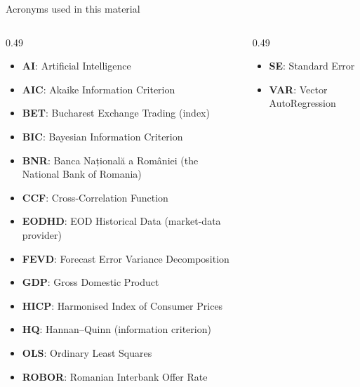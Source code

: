 {
\begin{frame}[noframenumbering]
    \titlepage
\end{frame}
}
\begin{frame}{Acronyms used in this material}
\begin{columns}[T]
\begin{column}{0.49\textwidth}
\begin{itemize}\setlength{\itemsep}{0pt}
    \item \textbf{AI}: Artificial Intelligence
    \item \textbf{AIC}: Akaike Information Criterion
    \item \textbf{BET}: Bucharest Exchange Trading (index)
    \item \textbf{BIC}: Bayesian Information Criterion
    \item \textbf{BNR}: Banca Națională a României (the National Bank of Romania)
    \item \textbf{CCF}: Cross-Correlation Function
    \item \textbf{EODHD}: EOD Historical Data (market-data provider)
    \item \textbf{FEVD}: Forecast Error Variance Decomposition
    \item \textbf{GDP}: Gross Domestic Product
    \item \textbf{HICP}: Harmonised Index of Consumer Prices
    \item \textbf{HQ}: Hannan–Quinn (information criterion)
    \item \textbf{OLS}: Ordinary Least Squares
    \item \textbf{ROBOR}: Romanian Interbank Offer Rate
\end{itemize}
\end{column}
\begin{column}{0.49\textwidth}
\begin{itemize}\setlength{\itemsep}{0pt}
    \item \textbf{SE}: Standard Error
    \item \textbf{VAR}: Vector AutoRegression
\end{itemize}
\end{column}
\end{columns}
\end{frame}

